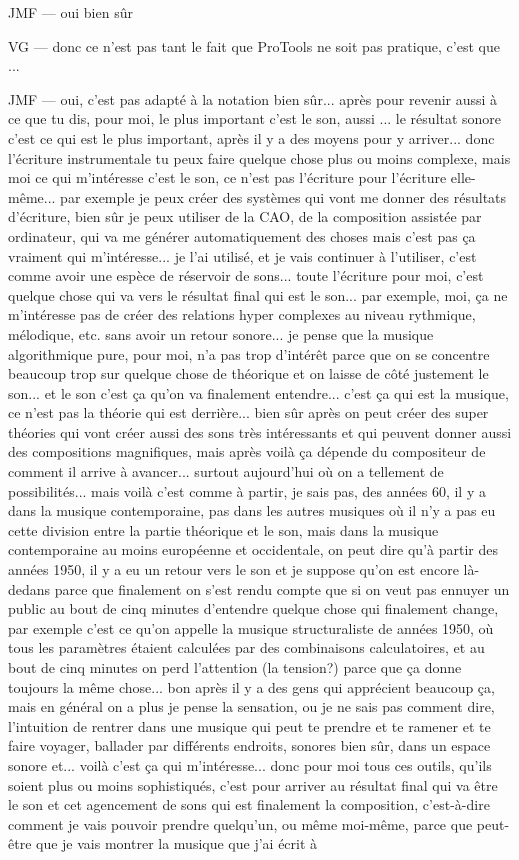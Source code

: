 JMF — oui bien sûr 

VG — donc ce n'est pas tant le fait que ProTools ne soit pas pratique, c'est que ... 

JMF — oui, c'est pas adapté à la notation bien sûr... après pour revenir aussi à ce que tu dis, pour moi, le plus important c'est le son, aussi ... le résultat sonore c'est ce qui est le plus important, après il y a des moyens pour y arriver... donc l'écriture instrumentale tu peux faire quelque chose plus ou moins complexe, mais moi ce qui m'intéresse c'est le son, ce n'est pas l'écriture pour l'écriture elle-même... par exemple je peux créer des systèmes qui vont me donner des résultats d'écriture, bien sûr je peux utiliser de la CAO, de la composition assistée par ordinateur, qui va me générer automatiquement des choses mais c'est pas ça vraiment qui m'intéresse... je l'ai utilisé, et je vais continuer à l'utiliser, c'est comme avoir une espèce de réservoir de sons... toute l'écriture pour moi, c'est quelque chose qui va vers le résultat final qui est le son... par exemple, moi, ça ne m'intéresse pas de créer des relations hyper complexes au niveau rythmique, mélodique, etc. sans avoir un retour sonore... je pense que la musique algorithmique pure, pour moi, n'a pas trop d'intérêt parce que on se concentre beaucoup trop sur quelque chose de théorique et on laisse de côté justement le son... et le son c'est ça qu'on va finalement entendre... c'est ça qui est la musique, ce n'est pas la théorie qui est derrière... bien sûr après on peut créer des super théories qui vont créer aussi des sons très intéressants et qui peuvent donner aussi des compositions magnifiques, mais après voilà ça dépende du compositeur de comment il arrive à avancer... surtout aujourd'hui où on a tellement de possibilités... mais voilà c'est comme à partir, je sais pas, des années 60, il y a dans la musique contemporaine, pas dans les autres musiques où il n'y a pas eu cette division entre la partie théorique et le son, mais dans la musique contemporaine au moins européenne et occidentale, on peut dire qu'à partir des années 1950, il y a eu un retour vers le son et je suppose qu'on est encore là-dedans parce que finalement on s'est rendu compte que si on veut pas ennuyer un public au bout de cinq minutes d'entendre quelque chose qui finalement change, par exemple c'est ce qu'on appelle la musique structuraliste de années 1950, où tous les paramètres étaient calculées par des combinaisons calculatoires, et au bout de cinq minutes on perd l'attention (la tension?) parce que ça donne toujours la même chose... bon après il y a des gens qui apprécient beaucoup ça, mais en général on a plus je pense la sensation, ou je ne sais pas comment dire, l'intuition de rentrer dans une musique qui peut te prendre et te ramener et te faire voyager, ballader par différents endroits, sonores bien sûr, dans un espace sonore et... voilà c'est ça qui m'intéresse... donc pour moi tous ces outils, qu'ils soient plus ou moins sophistiqués, c'est pour arriver au résultat final qui va être le son et cet agencement de sons qui est finalement la composition, c'est-à-dire comment je vais pouvoir prendre quelqu'un, ou même moi-même, parce que peut-être que je vais montrer la musique que j'ai écrit à 